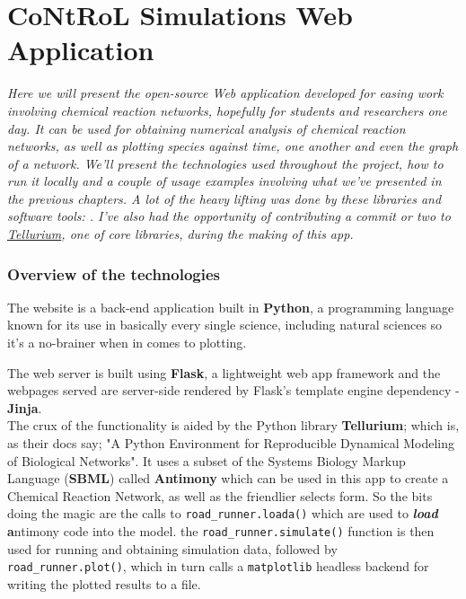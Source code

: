 \chapter{CoNtRoL Simulations Web Application}
\label{ch:web-app}

\textit{ Here we will present the open-source Web application developed for easing work involving chemical reaction networks, hopefully for students and researchers one day. It can be used for obtaining numerical analysis of chemical reaction networks, as well as plotting species against time, one another and even the graph of a network. We'll present the technologies used throughout the project, how to run it locally and a couple of usage examples involving what we've presented in the previous chapters. A lot of the heavy lifting was done by these libraries and software tools: \cite{10.1093/bioinformatics/btac730, xu2023SbmlDiagrams, medley2018tellurium, choi2018Tellurium}. I've also had the opportunity of contributing a commit or two to \href{https://github.com/sys-bio/tellurium}{Tellurium}, one of core libraries, during the making of this app.}

\subsection{Overview of the technologies}
The website is a back-end application built in \textbf{Python}, a programming language known for its use in basically every single science, including natural sciences so it's a no-brainer when in comes to plotting.

The web server is built using \textbf{Flask}, a lightweight web app framework and the webpages served are server-side rendered by Flask's template engine dependency - \textbf{Jinja}.
\\
The crux of the functionality is aided by the Python library \textbf{Tellurium}\cite{choi2018Tellurium,medley2018tellurium}; which is, as their docs say; "A Python Environment for Reproducible Dynamical Modeling of Biological Networks". It uses a subset of the Systems Biology Markup Language (\textbf{SBML})\cite{xu2023SbmlDiagrams,bornstein2008Libsbml, 10.1093/bioinformatics/btac730} called \textbf{Antimony} which can be used in this app to create a Chemical Reaction Network, as well as the friendlier selects form. So the bits doing the magic are the calls to \verb|road_runner.loada()| which are used to \textbf{\textit{load}}    \textbf{a}ntimony code into the model.
the \verb|road_runner.simulate()| function is then used for running and obtaining simulation data, followed by \verb|road_runner.plot()|, which in turn calls a \verb|matplotlib| headless backend for writing the plotted results to a file.

